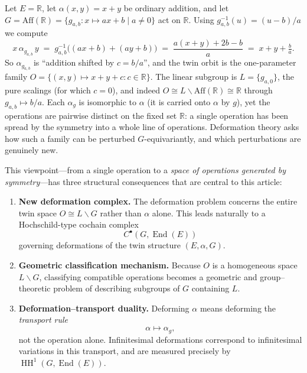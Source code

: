 \documentclass[11pt,a4paper]{article}
\numberwithin{equation}{section}
\newcommand{\R}{\mathbb{R}}
\DeclareMathOperator{\End}{End}
\DeclareMathOperator{\HH}{HH}
\newcommand{\TwinSpace}{(E,\alpha,G)}
\newcommand{\TwinOrbit}{O}
\newcommand{\LinearSubgroup}{L}
\newcommand{\Cochain}{C}
\begin{document}
	\begin{example}\label{ex:translated}
		Let $E=\R$, let $\alpha(x,y)=x+y$ be ordinary addition, and let $G=\mathrm{Aff}(\R)=\{g_{a,b}:x\mapsto ax+b\mid a\neq 0\}$
		act on $\R$. Using $g_{a,b}^{-1}(u)=(u-b)/a$ we compute
		\[
			x\,\alpha_{g_{a,b}}\,y \;=\; g_{a,b}^{-1}\!\big((ax+b)+(ay+b)\big)
			\;=\; \frac{a(x+y)+2b-b}{a} \;=\; x+y+\tfrac{b}{a}.
		\]
		So $\alpha_{g_{a,b}}$ is ``addition shifted by $c=b/a$'', and the twin orbit is the one-parameter
		family $\TwinOrbit=\{(x,y)\mapsto x+y+c : c\in\R\}$. The linear subgroup is
		$\LinearSubgroup=\{g_{a,0}\}$, the pure scalings (for which $c=0$), and indeed
		$\TwinOrbit\cong\LinearSubgroup\backslash\mathrm{Aff}(\R)\cong\R$ through $g_{a,b}\mapsto b/a$.
		Each $\alpha_{g}$ is isomorphic to $\alpha$ (it is carried onto $\alpha$ by $g$), yet the operations
		are pairwise distinct on the fixed set $\R$: a single operation has been spread by the symmetry into
		a whole line of operations. Deformation theory asks how such a family can be perturbed
		$G$-equivariantly, and which perturbations are genuinely new.
	\end{example}
	
	This viewpoint---from a single operation to a \emph{space of operations generated by symmetry}---has three structural consequences that are central to this article:
	
	\begin{enumerate}[label=(\roman*)]
		\item \textbf{New deformation complex.}  
		The deformation problem concerns the entire twin space $\TwinOrbit\cong \LinearSubgroup\backslash G$ rather than $\alpha$ alone.
		This leads naturally to a Hochschild-type cochain complex 
		\[
		\Cochain^\bullet(G,\End(E))
		\]
		governing deformations of the twin structure $\TwinSpace$.
		
		\item \textbf{Geometric classification mechanism.}  
		Because $\TwinOrbit$ is a homogeneous space $\LinearSubgroup\backslash G$, classifying compatible operations becomes
		a geometric and group--theoretic problem of describing subgroups of $G$ containing $\LinearSubgroup$.
		
		\item \textbf{Deformation--transport duality.}  
		Deforming $\alpha$ means deforming the \emph{transport rule}
		\[
		\alpha \mapsto \alpha_g,
		\]
		not the operation alone.  
		Infinitesimal deformations correspond to infinitesimal variations in this transport,
		and are measured precisely by $\HH^1(G,\End(E))$.
	\end{enumerate}
	
\end{document}
